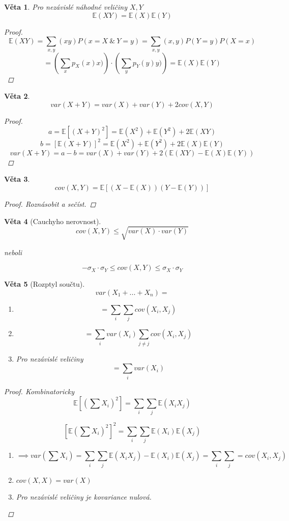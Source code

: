 \documentclass[10pt,a4paper]{article}
\theoremstyle{plain}
\newtheorem{veta}{Věta}
\theoremstyle{definition}
\begin{document}
\begin{veta}
Pro nezávislé náhodné veličiny $X,Y$
\[ \mathbb{E}(XY) = \mathbb{E}(X)\mathbb{E}(Y)\]
\begin{proof}
\[\mathbb{E}(XY) = \sum_{x,y} (xy) P(x = X\ \&\ Y=y) = \sum_{x,y} (x,y)P(Y=y)P(X=x)  \]\[ 
= \left( \sum_x p_X(x)x) \right) \cdot \left( \sum_y p_Y(y)y) \right) 
= \mathbb{E}(X)\mathbb{E}(Y)\]
\end{proof}
\end{veta}


\begin{veta}
\[var(X+Y) = var(X) + var(Y) + 2cov(X,Y) \]
\begin{proof}
\[ a = \mathbb{E}\left[ (X+Y)^2 \right] = \mathbb{E}(X^2)  + \mathbb{E}(Y^2) + 2\mathbb{E}(XY)  \]
\[ b  = \left[ \mathbb{E}(X+Y) \right]^2  =  \mathbb{E}(X^2)  + \mathbb{E}(Y^2) + 2 \mathbb{E}(X) \mathbb{E}(Y)\]
\[ var(X+Y) = a - b = var(X) + var(Y) + 2(\mathbb{E}(XY) -\mathbb{E}(X) \mathbb{E}(Y)) \]
\end{proof}
\end{veta}


\begin{veta}
\[ cov(X,Y) = \mathbb{E}\left[ (X-\mathbb{E}(X))(Y-\mathbb{E}(Y)) \right]\]
\begin{proof}
Roznásobit a sečíst.
\end{proof}
\end{veta}


\begin{veta}[Cauchyho nerovnost]
\[cov(X,Y) \leq \sqrt{var(X)\cdot var(Y)}\]

neboli

\[-\sigma_X\cdot \sigma_Y \leq cov(X,Y) \leq \sigma_X\cdot \sigma_Y\]
\end{veta}


\begin{veta}[Rozptyl součtu]
\[ var(X_1 + ... + X_n) = \]
\begin{enumerate}
\item \[ = \sum_i \sum_j cov(X_i, X_j)\]
\item \[ = \sum_i  var(X_i) \sum_{j \neq j} cov(X_i, X_j)\]
\item Pro nezávislé veličiny
 \[ = \sum_i  var(X_i) \]
\end{enumerate}
\begin{proof}
Kombinatoricky
\[ \mathbb{E}\left[\left(\sum X_i\right)^2\right] = \sum_i \sum_j \mathbb{E}( X_i X_j) \] 

\[ \left[ \mathbb{E} \left(\sum X_i\right)^2\right]^2 = \sum_i \sum_j \mathbb{E}( X_i) \mathbb{E}(X_j) \]

\begin{enumerate}
\item \[\implies  var\left(\sum X_i \right) = \sum_i \sum_j \mathbb{E}( X_i X_j) - \mathbb{E}( X_i) \mathbb{E}(X_j)  =   \sum_i \sum_j = cov(X_i, X_j) \] 
\item $cov(X,X) = var(X)$
\item Pro nezávislé veličiny je kovariance nulová.
\end{enumerate}
\end{proof}
\end{veta}
\end{document}
